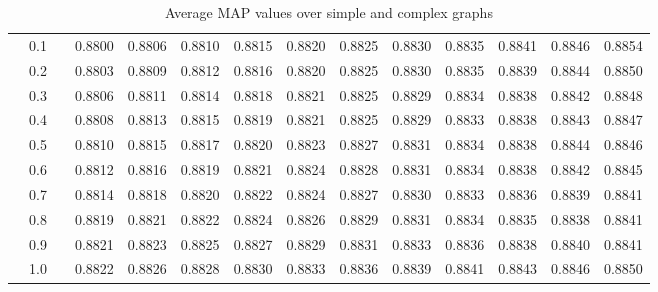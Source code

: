 \begin{table}
{\begin{tabular}{llc@{\hs}rrrrrrrrrrr}
			\phantom{a} & 0.1 & \phantom{a} & 0.8800 & 0.8806 & 0.8810 & 0.8815 & 0.8820 & 0.8825 & 0.8830 & 0.8835 & 0.8841 & 0.8846 & 0.8854 \\
			\phantom{a} & 0.2 & \phantom{a} & 0.8803 & 0.8809 & 0.8812 & 0.8816 & 0.8820 & 0.8825 & 0.8830 & 0.8835 & 0.8839 & 0.8844 & 0.8850 \\
			\phantom{a} & 0.3 & \phantom{a} & 0.8806 & 0.8811 & 0.8814 & 0.8818 & 0.8821 & 0.8825 & 0.8829 & 0.8834 & 0.8838 & 0.8842 & 0.8848 \\
			\phantom{a} & 0.4 & \phantom{a} & 0.8808 & 0.8813 & 0.8815 & 0.8819 & 0.8821 & 0.8825 & 0.8829 & 0.8833 & 0.8838 & 0.8843 & 0.8847 \\
			\phantom{a} & 0.5 & \phantom{a} & 0.8810 & 0.8815 & 0.8817 & 0.8820 & 0.8823 & 0.8827 & 0.8831 & 0.8834 & 0.8838 & 0.8844 & 0.8846 \\
			\phantom{a} & 0.6 & \phantom{a} & 0.8812 & 0.8816 & 0.8819 & 0.8821 & 0.8824 & 0.8828 & 0.8831 & 0.8834 & 0.8838 & 0.8842 & 0.8845 \\
			\phantom{a} & 0.7 & \phantom{a} & 0.8814 & 0.8818 & 0.8820 & 0.8822 & 0.8824 & 0.8827 & 0.8830 & 0.8833 & 0.8836 & 0.8839 & 0.8841 \\
			\phantom{a} & 0.8 & \phantom{a} & 0.8819 & 0.8821 & 0.8822 & 0.8824 & 0.8826 & 0.8829 & 0.8831 & 0.8834 & 0.8835 & 0.8838 & 0.8841 \\
			\phantom{a} & 0.9 & \phantom{a} & 0.8821 & 0.8823 & 0.8825 & 0.8827 & 0.8829 & 0.8831 & 0.8833 & 0.8836 & 0.8838 & 0.8840 & 0.8841 \\
			\phantom{a} & 1.0 & \phantom{a} & 0.8822 & 0.8826 & 0.8828 & 0.8830 & 0.8833 & 0.8836 & 0.8839 & 0.8841 & 0.8843 & 0.8846 & 0.8850 \\
			\bottomrule
		\end{tabular}
	}
	\caption{Average MAP values over simple and complex graphs}
	\label{appendix:ranking:tab:summary-ranking-norm}
\end{table}
